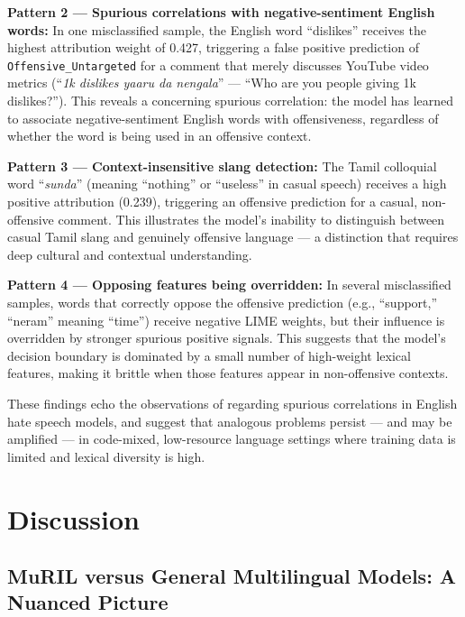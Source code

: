 \documentclass[12pt, a4paper]{article}
\begin{document}
\textbf{Pattern 2 --- Spurious correlations with negative-sentiment English words:} In one misclassified sample, the English word ``dislikes'' receives the highest attribution weight of 0.427, triggering a false positive prediction of \texttt{Offensive\_Untargeted} for a comment that merely discusses YouTube video metrics (``\textit{1k dislikes yaaru da nengala}'' --- ``Who are you people giving 1k dislikes?''). This reveals a concerning spurious correlation: the model has learned to associate negative-sentiment English words with offensiveness, regardless of whether the word is being used in an offensive context.

\textbf{Pattern 3 --- Context-insensitive slang detection:} The Tamil colloquial word ``\textit{sunda}'' (meaning ``nothing'' or ``useless'' in casual speech) receives a high positive attribution (0.239), triggering an offensive prediction for a casual, non-offensive comment. This illustrates the model's inability to distinguish between casual Tamil slang and genuinely offensive language --- a distinction that requires deep cultural and contextual understanding.

\textbf{Pattern 4 --- Opposing features being overridden:} In several misclassified samples, words that correctly oppose the offensive prediction (e.g., ``support,'' ``neram'' meaning ``time'') receive negative LIME weights, but their influence is overridden by stronger spurious positive signals. This suggests that the model's decision boundary is dominated by a small number of high-weight lexical features, making it brittle when those features appear in non-offensive contexts.

These findings echo the observations of \citet{mathew2021hatexplain} regarding spurious correlations in English hate speech models, and suggest that analogous problems persist --- and may be amplified --- in code-mixed, low-resource language settings where training data is limited and lexical diversity is high.

\section{Discussion}
\label{sec:discussion}

\subsection{MuRIL versus General Multilingual Models: A Nuanced Picture}
\end{document}

